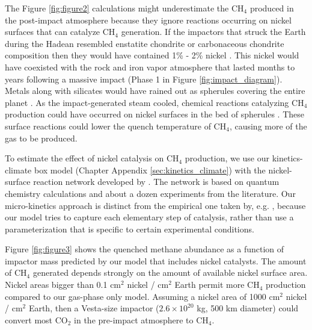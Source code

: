 The Figure \ref{fig:figure2} calculations might underestimate the CH$_4$ produced in the post-impact atmosphere because they ignore reactions occurring on nickel surfaces that can catalyze CH$_4$ generation. If the impactors that struck the Earth during the Hadean resembled enstatite chondrite or carbonaceous chondrite composition then they would have contained 1\% - 2\% nickel \citep[Table 15]{Lewis_1992}. This nickel would have coexisted with the rock and iron vapor atmosphere that lasted months to years following a massive impact (Phase 1 in Figure \ref{fig:impact_diagram}). Metals along with silicates would have rained out as spherules covering the entire planet \citep{Genda_2017}. As the impact-generated steam cooled, chemical reactions catalyzing CH$_4$ production could have occurred on nickel surfaces in the bed of spherules \citep{Schmider_2021}. These surface reactions could lower the quench temperature of CH$_4$, causing more of the gas to be produced.

To estimate the effect of nickel catalysis on CH$_4$ production, we use our kinetics-climate box model (Chapter Appendix \ref{sec:kinetics_climate}) with the nickel-surface reaction network developed by \citet{Schmider_2021}. The network is based on quantum chemistry calculations and about a dozen experiments from the literature. Our micro-kinetics approach is distinct from the empirical one taken by, e.g. \citet{Kress_2004}, because our model tries to capture each elementary step of catalysis, rather than use a parameterization that is specific to certain experimental conditions. 

Figure \ref{fig:figure3} shows the quenched methane abundance as a function of impactor mass predicted by our model that includes nickel catalysts. The amount of CH$_4$ generated depends strongly on the amount of available nickel surface area. Nickel areas bigger than 0.1 cm$^2$ nickel / cm$^2$ Earth permit more CH$_4$ production compared to our gas-phase only model. Assuming a nickel area of 1000 cm$^2$ nickel / cm$^2$ Earth, then a Vesta-size impactor ($2.6 \times 10^{20}$ kg, 500 km diameter) could convert most CO$_2$ in the pre-impact atmosphere to CH$_4$.

